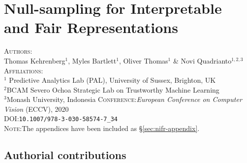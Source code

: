 \chapter{Null-sampling for Interpretable and Fair Representations}\label{ch:nifr}
\textsc{Authors}:\\
%
Thomas Kehrenberg$^1$,
%
Myles Bartlett$^1$,
%
Oliver Thomas$^1$ \&
%
Novi Quadrianto$^{1,2,3}$ \\
%
\textsc{Affiliations}:\\
%
$^1$ Predictive Analytics Lab (PAL), University of Sussex, Brighton, UK\\
%
$^2$BCAM Severo Ochoa Strategic Lab on Trustworthy Machine Learning \\
%
$^3$Monash University, Indonesia 
%
\textsc{Conference}:\;\;\textit{European Conference on Computer Vision} (ECCV), 2020 \\
%
\textsc{DOI}:\;\;\texttt{10.1007/978-3-030-58574-7\_34} \\
%
\textsc{Note}:\;\;The appendices have been included as \S\ref{sec:nifr-appendix}.
%








\newpage

\clearpage
\section{Authorial contributions}

